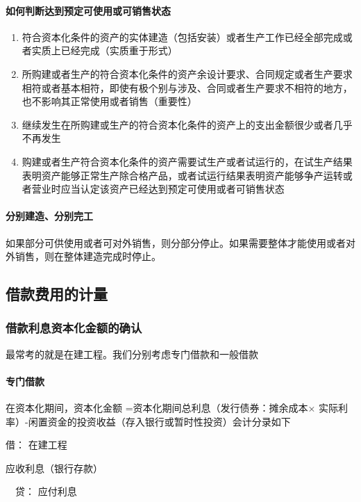 \documentclass[UTF8,12pt]{ctexart}
\newenvironment{Dr}{\noindent 借：}{\par}
\newenvironment{Cr}{\noindent \ \ 贷：}{\par}
\numberwithin{equation}{section} %
\numberwithin{figure}{section}
\numberwithin{table}{section}
\begin{document}
	\paragraph{如何判断达到预定可使用或可销售状态}
	\begin{enumerate}
		\item 符合资本化条件的资产的实体建造（包括安装）或者生产工作已经全部完成或者实质上已经完成（实质重于形式）
		
		\item 所购建或者生产的符合资本化条件的资产余设计要求、合同规定或者生产要求相符或者基本相符，即使有极个别与涉及、合同或者生产要求不相符的地方，也不影响其正常使用或者销售（重要性）
		
		\item 继续发生在所购建或生产的符合资本化条件的资产上的支出金额很少或者几乎不再发生
		
		\item 购建或者生产符合资本化条件的资产需要试生产或者试运行的，在试生产结果表明资产能够正常生产除合格产品，或者试运行结果表明资产能够争产运转或者营业时应当认定该资产已经达到预定可使用或者可销售状态
	\end{enumerate}
	
	\paragraph{分别建造、分别完工}如果部分可供使用或者可对外销售，则分部分停止。如果需要整体才能使用或者对外销售，则在整体建造完成时停止。
	
	\subsection{借款费用的计量}
	
	\subsubsection{借款利息资本化金额的确认}
	最常考的就是在建工程。我们分别考虑专门借款和一般借款
	
	\paragraph{专门借款}
	在资本化期间，资本化金额
	=资本化期间总利息（发行债券：摊余成本× 实际利率）-闲置资金的投资收益（存入银行或暂时性投资）会计分录如下
	
	\begin{Dr}
		在建工程
		
		应收利息（银行存款）
	\end{Dr}
	\begin{Cr}
		应付利息
	\end{Cr}
	
\end{document}
